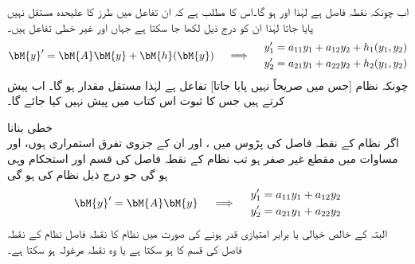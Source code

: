 اب چونکہ  نقطہ فاصل ہے لہٰذا اور    ہو گا۔اس کا مطلب ہے کہ ان تفاعل میں  طرز کا علیحدہ مستقل نہیں پایا جاتا لہٰذا ان کو درج ذیل لکھا جا سکتا ہے جہاں  اور  غیر خطی تفاعل ہیں۔
\begin{gather}\label{مساوات_نظام_غیر_خطی_ترکیب_مرحلہ_ب}
\begin{aligned}
\bM{y}'=\bM{A}\bM{y}+\bM{h}(\bM{y})
\end{aligned} \quad \implies \quad 
\begin{aligned}
y_1'&=a_{11}y_1+a_{12}y_2+h_1(y_1,y_2)\\
y_2'&=a_{21}y_1+a_{22}y_2+h_2(y_1,y_2)
\end{aligned}
\end{gather}
چونکہ نظام   [جس میں  صریحاً نہیں پایا جاتا] تفاعل ہے لہٰذا  مستقل مقدار ہو گا۔ اب  پیش کرتے ہیں جس کا ثبوت اس کتاب میں پیش نہیں کیا جائے گا۔

\quad خطی بنانا\\
اگر نظام  کے نقطہ فاصل  کی پڑوس میں  ،  اور ان کے جزوی تفرق استمراری ہوں، اور  مساوات  میں مقطع  غیر صفر  ہو تب نظام  کے نقطہ فاصل کی قسم اور استحکام وہی ہو گی جو درج ذیل  نظام کی ہو گی
\begin{gather}\label{مساوات_نظام_غیر_خطی_ترکیب_مرحلہ_پ}
\begin{aligned}
\bM{y}'=\bM{A}\bM{y}
\end{aligned} \quad \implies \quad 
\begin{aligned}
y_1'&=a_{11}y_1+a_{12}y_2\\
y_2'&=a_{21}y_1+a_{22}y_2
\end{aligned}
\end{gather}
البتہ  کے خالص خیالی یا برابر امتیازی قدر ہونے کی صورت میں نظام  کا نقطہ فاصل نظام  کے نقطہ فاصل کی قسم کا ہو سکتا ہے یا وہ نقطہ مرغولہ ہو سکتا ہے۔ 

